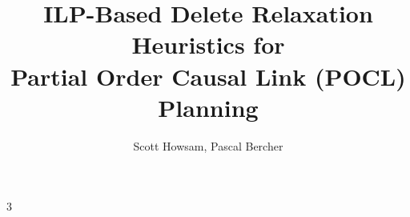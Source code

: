 \documentclass[a0,landscape,30pt]{sciposter}
\begin{document}




\title{ILP-Based Delete Relaxation Heuristics for\\Partial Order Causal Link (POCL) Planning}

\author{Scott Howsam, Pascal Bercher}
\renewcommand{\authorsize}{\huge}
\renewcommand{\titlesize}{\Huge}
\maketitle

\setlength{\columnseprule}{0pt}

\begin{multicols}{3}
  
\end{multicols}
\end{document}
